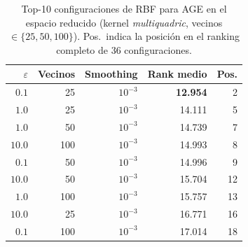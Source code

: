 \begin{table}[H]
    \centering
    \small
    \setlength{\tabcolsep}{5pt}
    \begin{tabular}{rrr|rr}
        \toprule
        \textbf{$\varepsilon$} & \textbf{Vecinos} & \textbf{Smoothing} & \textbf{Rank medio} & \textbf{Pos.} \\
        \midrule
        $0.1$ & 25 & $10^{-3}$ & \textbf{12.954} & 2 \\
        $1.0$ & 25 & $10^{-3}$ & 14.111 & 5 \\
        $1.0$ & 50 & $10^{-3}$ & 14.739 & 7 \\
        $10.0$ & 100 & $10^{-3}$ & 14.993 & 8 \\
        $0.1$ & 50 & $10^{-3}$ & 14.996 & 9 \\
        $10.0$ & 50 & $10^{-3}$ & 15.704 & 12 \\
        $1.0$ & 100 & $10^{-3}$ & 15.757 & 13 \\
        $10.0$ & 25 & $10^{-3}$ & 16.771 & 16 \\
        $0.1$ & 100 & $10^{-3}$ & 17.014 & 18 \\
        \bottomrule
    \end{tabular}
    \caption{Top-10 configuraciones de RBF para AGE en el espacio reducido (kernel \textit{multiquadric}, vecinos $\in\{25, 50, 100\}$). Pos.\ indica la posición en el ranking completo de 36 configuraciones.}
    \label{tab:rbf_apendice_age}
\end{table}
